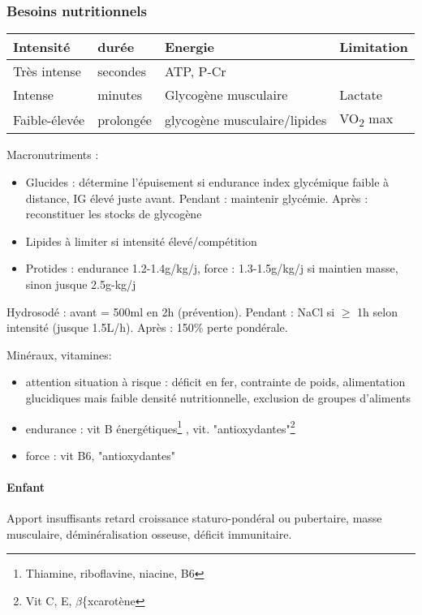 \documentclass[11pt]{article}
\begin{document}
\subsubsection{Besoins nutritionnels}
\label{sec:orgd9eb3fb}

\begin{center}
\begin{tabular}{llll}
Intensité & durée & Energie & Limitation\\
\hline
Très intense & secondes & ATP, P-Cr & \\
Intense & minutes & Glycogène musculaire & Lactate\\
Faible-élevée & prolongée & glycogène musculaire/lipides & VO\textsubscript{2} max\\
\end{tabular}
\end{center}

Macronutriments :
\begin{itemize}
\item Glucides : détermine l'épuisement si endurance \thus index glycémique faible à
distance, IG élevé juste avant. Pendant : maintenir glycémie. Après :
reconstituer les stocks de glycogène
\item Lipides à limiter si intensité élevé/compétition
\item Protides : endurance 1.2-1.4g/kg/j, force : 1.3-1.5g/kg/j si maintien masse, sinon jusque 2.5g-kg/j
\end{itemize}

Hydrosodé : avant = 500ml en 2h (prévention). Pendant : NaCl si \(\ge\) 1h selon
intensité (jusque 1.5L/h). Après : 150\% perte pondérale.

Minéraux, vitamines:
\begin{itemize}
\item attention situation à risque : déficit en fer, contrainte de poids,
alimentation glucidiques mais faible densité nutritionnelle, exclusion de
groupes d'aliments
\item endurance : vit B énergétiques\footnote{Thiamine, riboflavine, niacine, B6} , vit. "antioxydantes"\footnote{Vit C, E, \(\beta\)\{xcarotène}
\item force : \inc vit B6, \inc "antioxydantes"
\end{itemize}

\paragraph{Enfant}
\label{sec:org5753d0a}
Apport insuffisants \thus retard croissance staturo-pondéral ou pubertaire,
\dec masse musculaire, déminéralisation osseuse, déficit immunitaire.
\end{document}
